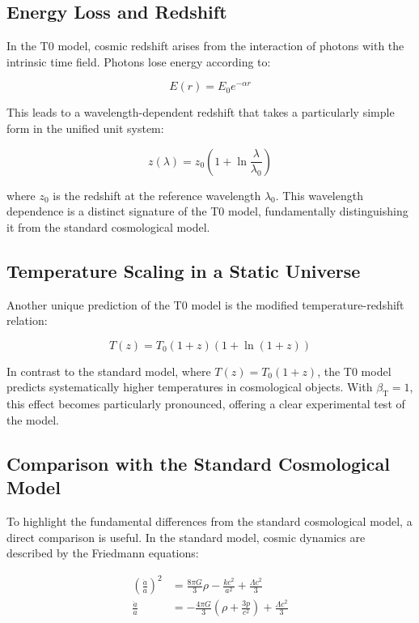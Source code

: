 \documentclass[12pt,a4paper]{article}
\newcommand{\betaT}{\beta_{\text{T}}}
\begin{document}
	\subsection{Energy Loss and Redshift}
	In the T0 model, cosmic redshift arises from the interaction of photons with the intrinsic time field. Photons lose energy according to:
	
	\begin{equation}
		E(r) = E_0 e^{-\alpha r}
	\end{equation}
	
	This leads to a wavelength-dependent redshift that takes a particularly simple form in the unified unit system:
	
	\begin{equation}
		z(\lambda) = z_0 \left(1 + \ln \frac{\lambda}{\lambda_0}\right)
	\end{equation}
	
	where \(z_0\) is the redshift at the reference wavelength \(\lambda_0\). This wavelength dependence is a distinct signature of the T0 model, fundamentally distinguishing it from the standard cosmological model.
	
	\subsection{Temperature Scaling in a Static Universe}
	Another unique prediction of the T0 model is the modified temperature-redshift relation:
	
	\begin{equation}
		T(z) = T_0 (1+z)(1 + \ln(1+z))
	\end{equation}
	
	In contrast to the standard model, where \(T(z) = T_0 (1+z)\), the T0 model predicts systematically higher temperatures in cosmological objects. With \(\betaT = 1\), this effect becomes particularly pronounced, offering a clear experimental test of the model.
	
	\subsection{Comparison with the Standard Cosmological Model}
	To highlight the fundamental differences from the standard cosmological model, a direct comparison is useful. In the standard model, cosmic dynamics are described by the Friedmann equations:
	
	\begin{align}
		\left(\frac{\dot{a}}{a}\right)^2 &= \frac{8\pi G}{3}\rho - \frac{kc^2}{a^2} + \frac{\Lambda c^2}{3} \\
		\frac{\ddot{a}}{a} &= -\frac{4\pi G}{3}\left(\rho + \frac{3p}{c^2}\right) + \frac{\Lambda c^2}{3}
	\end{align}
	
\end{document}
